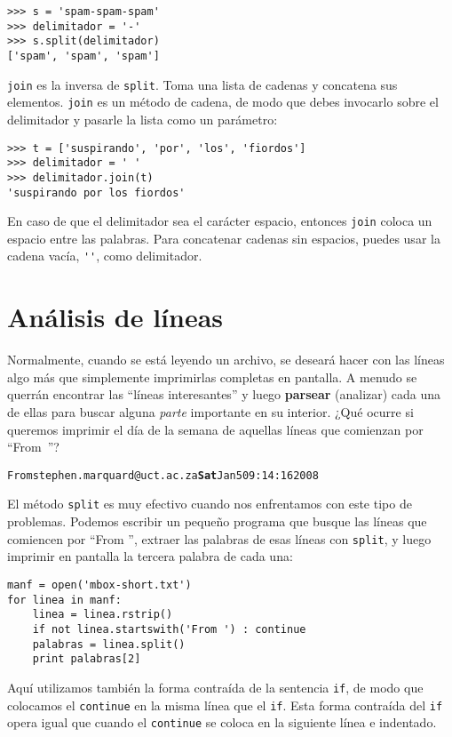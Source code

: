 
\beforeverb
\begin{verbatim}
>>> s = 'spam-spam-spam'
>>> delimitador = '-'
>>> s.split(delimitador)
['spam', 'spam', 'spam']
\end{verbatim}
\afterverb
%
{\tt join} es la inversa de {\tt split}. Toma
una lista de cadenas y
concatena sus elementos. {\tt join} es un método de cadena,
de modo que debes invocarlo sobre el delimitador y pasarle
la lista como un parámetro:


\beforeverb
\begin{verbatim}
>>> t = ['suspirando', 'por', 'los', 'fiordos']
>>> delimitador = ' '
>>> delimitador.join(t)
'suspirando por los fiordos'
\end{verbatim}
\afterverb
%
En caso de que el delimitador sea el carácter espacio,
entonces {\tt join} coloca un espacio entre las palabras. Para concatenar
cadenas sin espacios, puedes usar la cadena vacía,
\verb"''", como delimitador.



\section{Análisis de líneas}

Normalmente, cuando se está leyendo un archivo,
se deseará hacer con las líneas algo más que simplemente
imprimirlas completas en pantalla. A menudo se querrán encontrar
las ``líneas interesantes'' y luego {\bf parsear} (analizar) cada una de ellas
para buscar alguna \emph{parte} importante en su interior. ¿Qué ocurre si queremos
imprimir el día de la semana de aquellas líneas que comienzan por \mbox{``From ''?}

\beforeverb
\begin{alltt}
From stephen.marquard@uct.ac.za {\bf Sat} Jan  5 09:14:16 2008
\end{alltt}
\afterverb

El método {\tt split} es muy efectivo cuando nos enfrentamos con este
tipo de problemas.
Podemos escribir un pequeño programa que busque las líneas que
comiencen por ``From '', extraer las palabras de esas líneas con {\tt split},
y luego imprimir en pantalla la tercera palabra de cada una:

\beforeverb
\begin{verbatim}
manf = open('mbox-short.txt')
for linea in manf:
    linea = linea.rstrip()
    if not linea.startswith('From ') : continue
    palabras = linea.split()
    print palabras[2]
\end{verbatim}
\afterverb
%
Aquí utilizamos también la forma contraída de la sentencia
{\tt if}, de modo que colocamos el {\tt continue} en la
misma línea que el {\tt if}. Esta forma contraída
del {\tt if} opera igual que cuando el
{\tt continue} se coloca en la siguiente línea e indentado.

